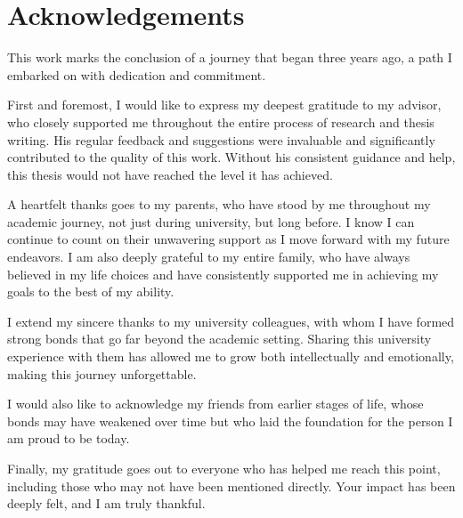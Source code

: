 \chapter*{Acknowledgements}


This work marks the conclusion of a journey that began three years ago, a path I embarked on with dedication and commitment. 

First and foremost, I would like to express my deepest gratitude to my advisor, who closely supported me throughout the entire process of research and thesis writing. His regular feedback and suggestions were invaluable and significantly contributed to the quality of this work. Without his consistent guidance and help, this thesis would not have reached the level it has achieved.

A heartfelt thanks goes to my parents, who have stood by me throughout my academic journey, not just during university, but long before. I know I can continue to count on their unwavering support as I move forward with my future endeavors. I am also deeply grateful to my entire family, who have always believed in my life choices and have consistently supported me in achieving my goals to the best of my ability.

I extend my sincere thanks to my university colleagues, with whom I have formed strong bonds that go far beyond the academic setting. Sharing this university experience with them has allowed me to grow both intellectually and emotionally, making this journey unforgettable.

I would also like to acknowledge my friends from earlier stages of life, whose bonds may have weakened over time but who laid the foundation for the person I am proud to be today.

Finally, my gratitude goes out to everyone who has helped me reach this point, including those who may not have been mentioned directly. Your impact has been deeply felt, and I am truly thankful.

